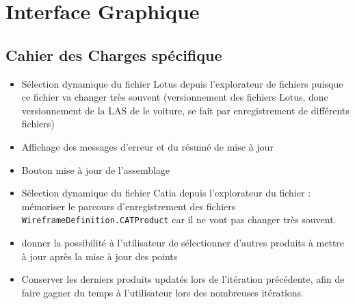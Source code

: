\section{Interface Graphique}
\label{interf_graph}
\subsection{Cahier des Charges spécifique} %
\begin{itemize}
    \item Sélection dynamique du fichier Lotus depuis l'explorateur de fichiers puisque ce fichier va changer très souvent (versionnement des fichiers Lotus, donc versionnement de la LAS de le voiture, se fait par enregistrement de différents fichiers) 
    \item Affichage des messages d'erreur et du résumé de mise à jour
    \item Bouton mise à jour de l'assemblage
    \item Sélection dynamique du fichier Catia depuis l'explorateur du fichier : mémoriser le parcours d'enregistrement des fichiers \texttt{WireframeDefinition.CATProduct} car il ne vont pas changer très souvent.
    \item donner la possibilité à l'utilisateur de sélectionner d'autres produits à mettre à jour après la mise à jour des points
    \item Conserver les derniers produits updatés lors de l'itération précédente, afin de faire gagner du temps à l'utilisateur lors des nombreuses itérations.
\end{itemize}



